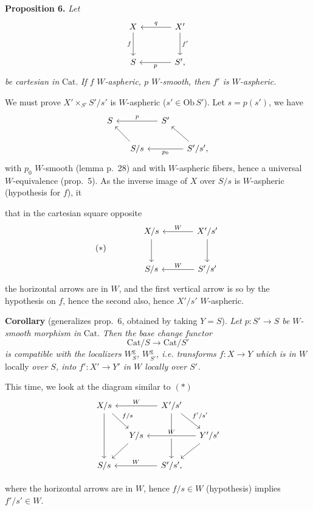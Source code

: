 \documentclass[11pt]{article}
\newcommand{\printedpage}[1]{\marginpar{\footnotesize p.~#1}}
\newcommand{\msp}[1]{\marginpar{\footnotesize [#1]}}
\newcommand{\Cat}{\mathrm{Cat}}
\newcommand{\Ob}{\mathrm{Ob}}
\begin{document}
\printedpage{25}
\textbf{Proposition 6.} \textit{Let}
\[
\begin{tikzcd}[row sep=large, column sep=large]
X & X' \arrow[l, "q"'] \arrow[d, "f'"] \\
S \arrow[from=u, "f"'] & S', \arrow[l, "p"]
\end{tikzcd}
\]
\textit{be cartesian in} $\Cat$. \textit{If $f$} \textit{$W$-aspheric, $p$ $W$-smooth, then $f'$ is $W$-aspheric.}

We must prove $X'\times_{S'}S'/s'$ is $W$-aspheric ($s'\in\Ob\,S'$). Let $s=p(s')$, we have
\[
\begin{tikzcd}[column sep=small]
S & & S' \arrow[ll, "p"'] & \\
& S/s \arrow[ul] & & S'/s', \arrow[ul] \arrow[ll, "p_0"]
\end{tikzcd}
\]
with $p_0$ $W$-smooth (lemma p.~28) and with $W$-aspheric fibers, hence a universal $W$-equivalence (prop.~5). As the inverse image of $X$ over $S/s$ is $W$-aspheric (hypothesis for $f$), it

\leavevmode\msp{page 32}that in the cartesian square opposite
\[
(*)\qquad\qquad
\begin{tikzcd}[row sep=large, column sep=large]
X/s \arrow[d] & X'/s' \arrow[l, "W"'] \arrow[d] \\
S/s & S'/s' \arrow[l, "W"']
\end{tikzcd}
\]
the horizontal arrows are in $W$, and the first vertical arrow is so by the hypothesis on $f$, hence the second also, hence $X'/s'$ $W$-aspheric.

\textbf{Corollary} (generalizes prop.~6, obtained by taking $Y=S$). \textit{Let $p : S'\longrightarrow S$ be} \textit{$W$-smooth morphism in} $\Cat$. \textit{Then the base change functor}
\[
\Cat/S\longrightarrow\Cat/S'
\]
\textit{is compatible with the localizers $W^{\mathrm{g}}_S$, $W^{\mathrm{g}}_{S'}$, i.e. transforms $f : X\longrightarrow Y$ which is in $W$} locally \textit{over $S$, into $f' : X'\longrightarrow Y'$ in $W$ locally over $S'$.}

This time, we look at the diagram similar to $(*)$
\[
\begin{tikzcd}[column sep=small]
X/s \arrow[dd] \arrow[dr, "f/s"] & & X'/s' \arrow[ll, "W"'] \arrow[dd] \arrow[dr, "f'/s'"] & \\
& Y/s \arrow[dl] & & Y'/s' \arrow[ll, "W"', crossing over] \arrow[dl] \\
S/s & & S'/s', \arrow[ll, "W"'] &
\end{tikzcd}
\]

\printedpage{26}
where the horizontal arrows are in $W$, hence $f/s\in W$ (hypothesis) implies $f'/s'\in W$.
\end{document}
